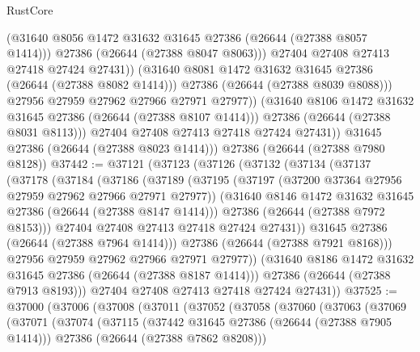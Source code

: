 \begin{lexlean}{RustCore}
\begin{coremodule}
                        (@31640 @8056 @1472 @31632 @31645 @27386 (@26644 (@27388 @8057 @1414)))
                        @27386
                        (@26644 (@27388 @8047 @8063)))
                      @27404
                      @27408
                      @27413
                      @27418
                      @27424
                      @27431))
                  (@31640 @8081 @1472 @31632 @31645 @27386 (@26644 (@27388 @8082 @1414)))
                  @27386
                  (@26644 (@27388 @8039 @8088)))
                @27956
                @27959
                @27962
                @27966
                @27971
                @27977))
            (@31640 @8106 @1472 @31632 @31645 @27386 (@26644 (@27388 @8107 @1414)))
            @27386
            (@26644 (@27388 @8031 @8113)))
          @27404
          @27408
          @27413
          @27418
          @27424
          @27431))
      @31645
      @27386
      (@26644 (@27388 @8023 @1414)))
    @27386
    (@26644 (@27388 @7980 @8128))
@37442 := @37121
    (@37123
      (@37126
        (@37132
          (@37134
            (@37137
              (@37178
                (@37184
                  (@37186
                    (@37189
                      (@37195
                        (@37197 (@37200 @37364 @27956 @27959 @27962 @27966 @27971 @27977))
                        (@31640 @8146 @1472 @31632 @31645 @27386 (@26644 (@27388 @8147 @1414)))
                        @27386
                        (@26644 (@27388 @7972 @8153)))
                      @27404
                      @27408
                      @27413
                      @27418
                      @27424
                      @27431))
                  @31645
                  @27386
                  (@26644 (@27388 @7964 @1414)))
                @27386
                (@26644 (@27388 @7921 @8168)))
              @27956
              @27959
              @27962
              @27966
              @27971
              @27977))
          (@31640 @8186 @1472 @31632 @31645 @27386 (@26644 (@27388 @8187 @1414)))
          @27386
          (@26644 (@27388 @7913 @8193)))
        @27404
        @27408
        @27413
        @27418
        @27424
        @27431))
@37525 := @37000
    (@37006
      (@37008
        (@37011
          (@37052
            (@37058
              (@37060
                (@37063
                  (@37069
                    (@37071
                      (@37074
                        (@37115
                          (@37442 @31645 @27386 (@26644 (@27388 @7905 @1414)))
                          @27386
                          (@26644 (@27388 @7862 @8208)))

\end{coremodule}
\end{lexlean}
